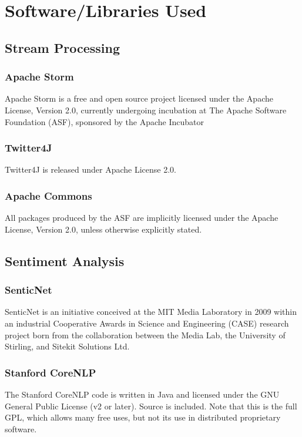 \documentclass{llncs}
\begin{document}
\section{Software/Libraries Used}

\subsection{Stream Processing}

\subsubsection{Apache Storm}
Apache Storm is a free and open source project licensed under the Apache License, Version 2.0, currently undergoing incubation at The Apache Software Foundation (ASF), sponsored by the Apache Incubator

\subsubsection{Twitter4J}
Twitter4J is released under Apache License 2.0.

\subsubsection{Apache Commons}
All packages produced by the ASF are implicitly licensed under the Apache License, Version 2.0, unless otherwise explicitly stated.

\subsection{Sentiment Analysis}
\subsubsection{SenticNet}
SenticNet is an initiative conceived at the MIT Media Laboratory in 2009 within an industrial Cooperative Awards in Science and Engineering (CASE) research project born from the collaboration between the Media Lab, the University of Stirling, and Sitekit Solutions Ltd.

\subsubsection{Stanford CoreNLP}
The Stanford CoreNLP code is written in Java and licensed under the GNU General Public License (v2 or later). Source is included. Note that this is the full GPL, which allows many free uses, but not its use in distributed proprietary software.
\end{document}
